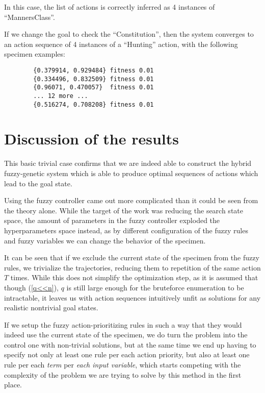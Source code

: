 \documentclass[12pt, a4paper]{report}
\begin{document}
	In this case, the list of actions is correctly inferred as 4 instances of ``MannersClass''.
	
	If we change the goal to check the ``Constitution'', then the system converges to an action sequence of 4 instances of a ``Hunting'' action, with the following specimen examples:
	
	\begin{verbatim}
		{0.379914, 0.929484} fitness 0.01
		{0.334496, 0.832509} fitness 0.01
		{0.96071, 0.470057}  fitness 0.01
		... 12 more ...
		{0.516274, 0.708208} fitness 0.01
	\end{verbatim}
	
	
	\section{Discussion of the results}
		
	This basic trivial case confirms that we are indeed able to construct the hybrid fuzzy-genetic system which is able to produce optimal sequences of actions which lead to the goal state.
		
	Using the fuzzy controller came out more complicated than it could be seen from the theory alone.
	While the target of the work was reducing the search state space, the amount of parameters in the fuzzy controller exploded the hyperparameters space instead, as by different configuration of the fuzzy rules and fuzzy variables we can change the behavior of the specimen.
	
	It can be seen that if we exclude the current state of the specimen from the fuzzy rules, we trivialize the trajectories, reducing them to repetition of the same action $T$ times.
	While this does not simplify the optimization step, as it is assumed that though (\ref{q<<n}), $q$ is still large enough for the bruteforce enumeration to be intractable, it leaves us with action sequences intuitively unfit as solutions for any realistic nontrivial goal states.
	
	If we setup the fuzzy action-prioritizing rules in such a way that they would indeed use the current state of the specimen, we do turn the problem into the control one with non-trivial solutions, but at the same time we end up having to specify not only at least one rule per each action priority, but also at least one rule per each \textit{term} per \textit{each input variable}, which starts competing with the complexity of the problem we are trying to solve by this method in the first place.
	
\end{document}

